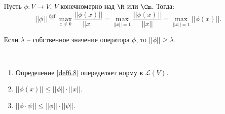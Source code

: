 \begin{definition}
    \label{def6.8}
    Пусть $\phi: V \to V$, $V$ конечномерно над $\R$ или $\Cm$. Тогда:
    $$||\phi|| \overset{\text{def}}{=} \underset{x \neq 0}{\max} \frac{||\phi(x)||}{||x||} = 
    \underset{||x|| = 1}{\max} \frac{||\phi(x)||}{||x||} = \underset{||x|| = 1}{\max} ||\phi(x)||.$$
\end{definition}

\begin{note}
    Если $\lambda$ -- собственное значение оператора $\phi$, то $||\phi|| \geq \lambda$.
\end{note}

\begin{proposition}~
    \begin{enumerate}
        \item Определение \ref{def6.8} опеределяет норму в $\mathcal{L}(V)$.
        \item $||\phi(x)|| \leq ||\phi|| \cdot ||x||$.
        \item $||\phi \cdot \psi|| \leq ||\phi|| \cdot ||\psi||$.
    \end{enumerate}
\end{proposition}

